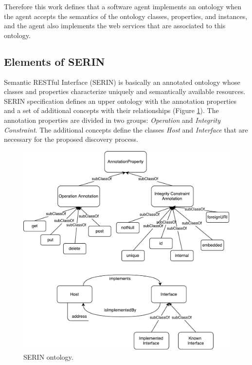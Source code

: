 \documentclass{singlecol-new}
\theoremstyle{TH}{
\newtheorem{lemma}{Lemma}
\newtheorem{theorem}[lemma]{Theorem}
\newtheorem{corrolary}[lemma]{Corrolary}
\newtheorem{conjecture}[lemma]{Conjecture}
\newtheorem{proposition}[lemma]{Proposition}
\newtheorem{claim}[lemma]{Claim}
\newtheorem{stheorem}[lemma]{Wrong Theorem}
\newtheorem{algorithm}{Algorithm}
}
\theoremstyle{THrm}{
\newtheorem{definition}{Definition}[section]
\newtheorem{question}{Question}[section]
\newtheorem{remark}{Remark}
\newtheorem{scheme}{Scheme}
}
\theoremstyle{THhit}{
\newtheorem{case}{Case}[section]
}
\begin{document}
Therefore this work defines that a software agent implements an ontology when the agent accepts the semantics of the ontology classes, properties, and instances, and the agent also implements the web services that are associated to this ontology.

\subsection{Elements of SERIN}
\label{sec:serin-elements}
Semantic RESTful Interface (SERIN) \citep{Muniz2013a,lira2014semantic} is basically an annotated ontology whose classes and properties characterize uniquely and semantically available resources. 
SERIN specification defines an upper ontology with the annotation properties and a set of additional concepts with their relationships (Figure \ref{fig:serinontology}). 
The annotation properties are divided in two groups: \textit{Operation} and \textit{Integrity Constraint}. 
The additional concepts define the classes \textit{Host} and \textit{Interface} that are necessary for the proposed discovery process.

\begin{figure}[!htb]
	\includegraphics[scale=.5]{images/serin-ontology.pdf}
	\centering
	\caption{SERIN ontology.}
	\label{fig:serinontology}
\end{figure}
\end{document}
